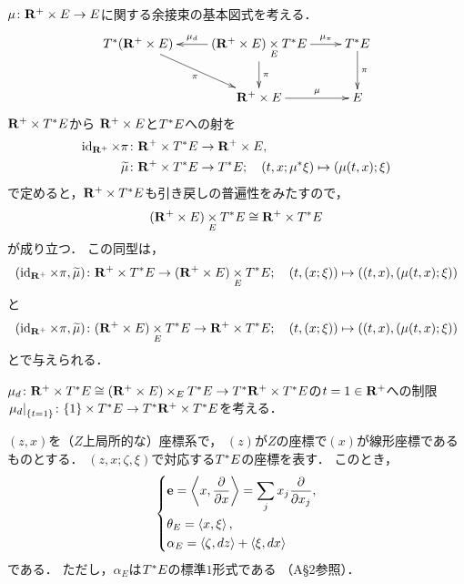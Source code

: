 \begin{CMT*}
    \(\mu\colon \rrp\times E\to E\)に関する余接束の基本図式を考える．
    \[\vcenter{\xymatrix{
        \cotb[(\rrp\times E)]
        \ar[rd]_-{\pi}
        &
        (\rrp\times E)\pb[E]\cotb[E]
        \ar[l]_-{\mdiff[\mu]}
        \ar[r]^-{\mpb[\mu]}
        \ar[d]^-{\pi}
        &
        \cotb[E]
        \ar[d]^-{\pi}
        \\
        &
        \rrp\times E
        \ar[r]^-{\mu}
        &
        E
    }}\]
    \(\rrp\times \cotb[E]\)から
    \(\rrp\times E\)と\(\cotb[E]\)への射を
    \begin{align*}
        \id_{\rrp}\times\pi&\colon
        \rrp\times \cotb[E] \to\rrp\times E,\\
        \widetilde{\mu}&\colon
        \rrp\times \cotb[E] \to \cotb[E];
        \quad 
        (t,x;\mu^{\ast}\xi)\mapsto(\mu(t,x);\xi)
    \end{align*}
    で定めると，\(\rrp\times \cotb[E]\)も引き戻しの普遍性をみたすので，
    \[
        (\rrp\times E)\pb[E]\cotb[E]
        \cong
        \rrp\times \cotb[E]
    \]が成り立つ．
    この同型は，\[
        (\id_{\rrp}\times\pi,\widetilde{\mu})\colon
        \rrp\times \cotb[E]
        \to
        (\rrp\times E)\pb[E]\cotb[E];\quad
        \left(t,\left(x;\xi\right)\right)
        \mapsto
        ((t,x),(\mu(t,x);\xi))
    \]と\[
        (\id_{\rrp}\times\pi,\widetilde{\mu})\colon
        (\rrp\times E)\pb[E]\cotb[E]
        \to
        \rrp\times \cotb[E]
        ;\quad
        \left(t,\left(x;\xi\right)\right)
        \mapsto
        ((t,x),(\mu(t,x);\xi))
    \]とで与えられる．
    
    \(
        \mdiff[\mu]\colon
        \rrp\times \cotb[E]
        \cong
        (\rrp\times E)\times_{E}\cotb[E]
        \to
        \cotb[\rrp]\times\cotb[E]
    \)の\(t=1\in\rrp\)への制限\(
        \mres[{\mdiff[\mu]}]{\{t=1\}}
        \colon
        \{1\}\times \cotb[E]\to
        \cotb[\rrp]\times\cotb[E]
    \)を考える．
\end{CMT*}

\((z,x)\)を（\(Z\)上局所的な）座標系で，
\((z)\)が\(Z\)の座標で\((x)\)が線形座標であるものとする．
\((z,x;\zeta,\xi)\)で対応する\(\cotb[E]\)の座標を表す．
このとき，
\begin{equation}
    \begin{dcases}
        \eu=\left\langle{x,\dfrac{\partial}{\partial{x}}}\right\rangle=\sum_{j}x_{j}\dfrac{\partial}{\partial{x_{j}}},\\
        \theta_{E}=\left\langle{x,\xi}\right\rangle,\\
        \alpha_{E}=\left\langle{\zeta,dz}\right\rangle+\left\langle{\xi,dx}\right\rangle
    \end{dcases}
\end{equation}
である．
ただし，\(\alpha_{E}\)は\(\cotb[E]\)の標準\(1\)形式である
（A\S2参照）．

